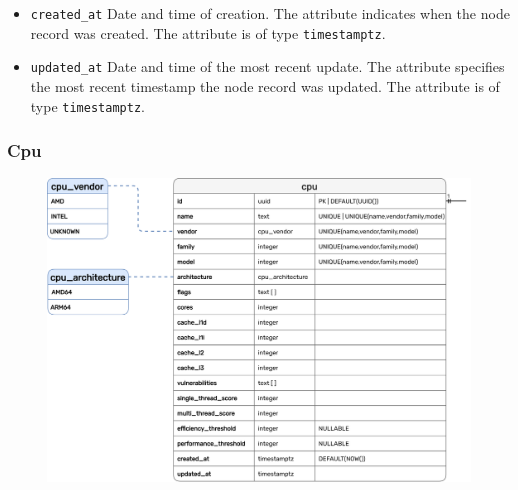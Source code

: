\begin{itemize}
  \item \texttt{created\_at}
    \newline
    Date and time of creation.
    \newline
    The attribute indicates when the node record was created.
    \newline
    The attribute is of type \texttt{timestamptz}.

  \item \texttt{updated\_at}
    \newline
    Date and time of the most recent update.
    \newline
    The attribute specifies the most recent timestamp the node record was updated.
    \newline
    The attribute is of type \texttt{timestamptz}.
\end{itemize}

\pagebreak


\subsubsection{Cpu}
\label{subsubsec:implementation_server_database_cpu}

\begin{figure}
  \centering
  \includegraphics[width=\linewidth]{images/implementation/erm_cpu.png}
\end{figure}

